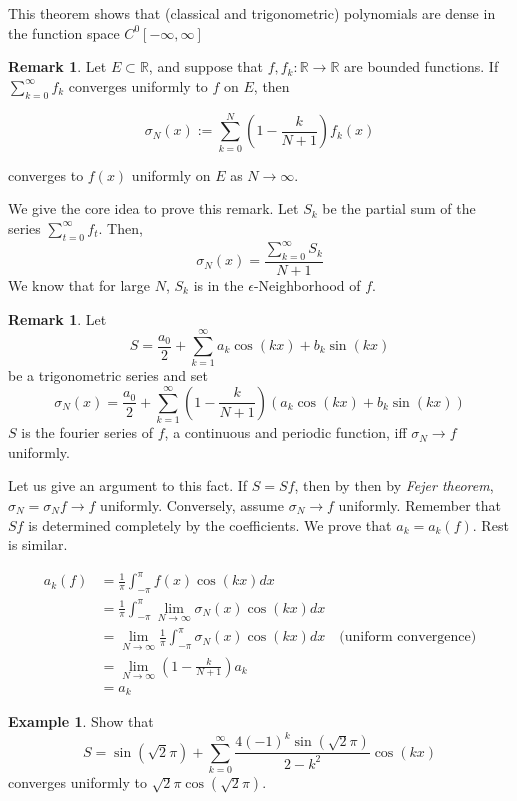\documentclass[12pt]{amsart}
\theoremstyle{definition}
\newtheorem{example}[theorem]{Example}
\newtheorem{remark}[theorem]{Remark}
\begin{document}
This theorem shows that (classical and trigonometric) polynomials are dense in the function space $C^{0}[-\infty, \infty]$


\begin{remark}
    Let $E \subset \mathbb{R}$, and suppose that $f, f_k : \mathbb{R} \to \mathbb{R}$ are bounded functions. If $\sum_{k = 0}^{ \infty} f_k$ converges uniformly to $f$ on $E$, then

\[\sigma_N(x) := \sum_{k=0}^{N} (1 - \frac{k}{N+1}) f_k(x)\]

converges to $f(x)$ uniformly on $E$ as $N \to \infty$.
\end{remark}


 We give the core idea to prove this remark. Let $S_k$ be the partial sum of the series  $\sum_{t = 0}^{\infty}f_t$. Then,
\[
\sigma_N(x) = \frac{\sum_{k = 0}^{\infty}S_k}{N+1}
\]
We know that for large $N$, $S_k$ is in the $\epsilon$-Neighborhood of \(f\).



\begin{remark}
    Let
    \[
    S = \frac{a_0}{2} +\sum_{k=1}^{\infty}a_k\cos(kx) + b_k\sin(kx)
    \]
    be a trigonometric series and set
    \[
    \sigma_N(x) = \frac{a_0}{2} +\sum_{k=1}^{\infty}(1 - \frac{k}{N+1})(a_k\cos(kx) + b_k\sin(kx))
    \]
    $S$ is the fourier series of $f$, a continuous and periodic function, iff $\sigma_N \to f$ uniformly.
\end{remark}


Let us give an argument to this fact.
    If $ S = Sf$, then by then by \textit{Fejer theorem}, $\sigma_N = \sigma_Nf \to f$ uniformly.
    Conversely, assume $\sigma_N \to f$ uniformly. Remember that $Sf$ is determined completely by the coefficients. We prove that $a_k = a_k(f)$. Rest is similar.

    \begin{align*}
        a_k(f) &= \frac{1}{\pi} \int_{-\pi}^{\pi} f(x) \cos(kx) dx\\
        &= \frac{1}{\pi} \int_{-\pi}^{\pi} \lim_{N \to \infty}\sigma_N(x) \cos(kx) dx\\
        &= \lim_{N \to \infty} \frac{1}{\pi} \int_{-\pi}^{\pi} \sigma_N(x) \cos(kx) dx \quad \text{(uniform convergence)}\\
        &= \lim_{N \to \infty} (1 - \frac{k}{N+1})a_k \\
        &= a_k
    \end{align*}



\begin{example}
    Show that
    \[
    S = \sin(\sqrt{2}\pi) + \sum_{k=0}^{\infty}\frac{4(-1)^k\sin(\sqrt{2}\pi)}{2-k^2}\cos(kx)
    \]
    converges uniformly to $\sqrt{2}\pi\cos(\sqrt{2}\pi)$.
\end{example}
\end{document}
